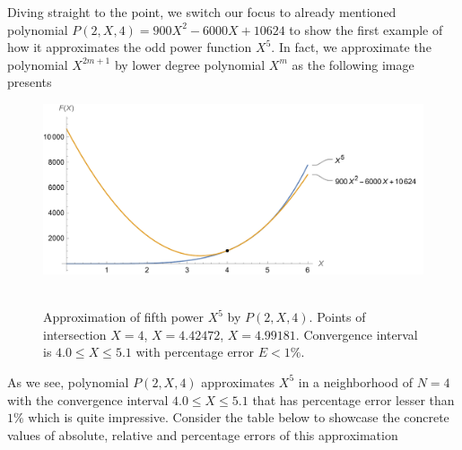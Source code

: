 Diving straight to the point, we switch our focus to already mentioned polynomial $P(2,X,4) = 900X^2 - 6000X + 10624$
to show the first example of how it approximates the odd power function $X^5$.
In fact, we approximate the polynomial $X^{2m+1}$ by lower degree polynomial $X^m$ as the following image presents
\begin{figure}[H]
    \centering
    \includegraphics[width=1\textwidth]{sections/images/03_plots_polynomial_p2_n4_with_fifth}
    ~\caption{Approximation of fifth power $X^5$ by $P(2, X, 4)$.
    Points of intersection $X=4$, $X=4.42472$, $X=4.99181$.
    Convergence interval is $4.0 \leq X \leq 5.1$ with percentage error $E < 1\%$.
    }\label{fig:03_plots_polynomial_p2_n4_with_fifth}
\end{figure}
As we see, polynomial $P(2, X, 4)$ approximates $X^5$ in a neighborhood of $N=4$ with
the convergence interval $4.0 \leq X \leq 5.1$ that has percentage error lesser than $1\%$ which is quite impressive.
Consider the table below to showcase the concrete values of absolute, relative and percentage errors of this approximation


